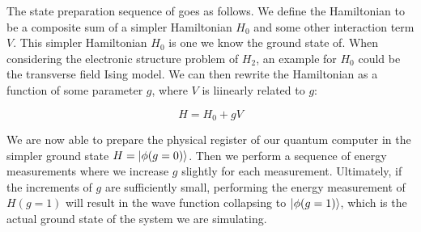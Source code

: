 The state preparation sequence of  goes as follows. We define the Hamiltonian to be a composite sum of a simpler Hamiltonian $H_0$ and some other interaction term $V$. This simpler Hamiltonian $H_0$ is one we know the ground state of. When considering the electronic structure problem of $H_2$, an example for $H_0$ could be the transverse field Ising model. We can then rewrite the Hamiltonian as a function of some parameter $g$, where $V$ is liinearly related to $g$:

$$
H= H_0 + gV
$$

We are now able to prepare the physical register of our quantum computer in the simpler ground state $ H = \left\vert{\phi(g=0)}\right\rangle$.  Then we perform a sequence of energy measurements where we increase $g$ slightly for each measurement. Ultimately, if the increments of $g$ are sufficiently small, performing the energy measurement of $H(g=1)$ will result in the wave function collapsing to $ \left\vert{\phi(g=1)}\right\rangle$, which is the actual ground state of the system we are simulating. 

